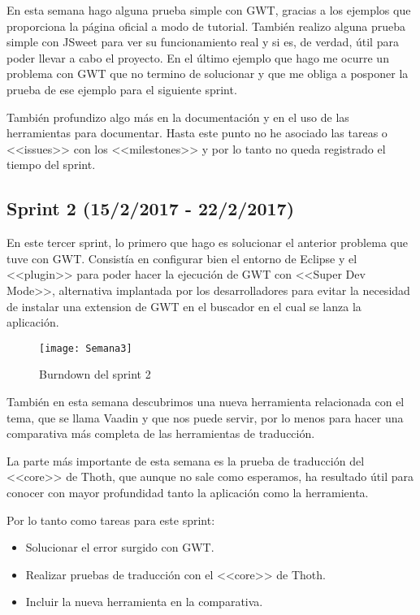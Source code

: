 En esta semana hago alguna prueba simple con GWT, gracias a los ejemplos que proporciona la página oficial a modo de tutorial. También realizo alguna prueba simple con JSweet para ver su funcionamiento real y si es, de verdad, útil para poder llevar a cabo el proyecto. En el último ejemplo que hago me ocurre un problema con GWT que no termino de solucionar y que me obliga a posponer la prueba de ese ejemplo para el siguiente sprint.

También profundizo algo más en la documentación y en el uso de las herramientas para documentar. Hasta este punto no he asociado las tareas o <<issues>> con los <<milestones>> y por lo tanto no queda registrado el tiempo del sprint.

\subsection{Sprint 2 (15/2/2017 - 22/2/2017)}

En este tercer sprint, lo primero que hago es solucionar el anterior problema que tuve con GWT. Consistía en configurar bien el entorno de Eclipse y el <<plugin>> para poder hacer la ejecución de GWT con <<Super Dev Mode>>, alternativa implantada por los desarrolladores para evitar la necesidad de instalar una extension de GWT en el buscador en el cual se lanza la aplicación.

\begin{figure}[h]
\centering
\texttt{[image: Semana3]}
\caption{Burndown del sprint 2}
\label{fig:A.2.6}
\end{figure}

También en esta semana descubrimos una nueva herramienta relacionada con el tema, que se llama Vaadin y que nos puede servir, por lo menos para hacer una comparativa más completa de las herramientas de traducción. 

La parte más importante de esta semana es la prueba de traducción del <<core>> de Thoth, que aunque no sale como esperamos, ha resultado útil para conocer con mayor profundidad tanto la aplicación como la herramienta.

Por lo tanto como tareas para este sprint:

\begin{itemize}
\item Solucionar el error surgido con GWT.
\item Realizar pruebas de traducción con el <<core>> de Thoth.
\item Incluir la nueva herramienta en la comparativa.
\end{itemize}

